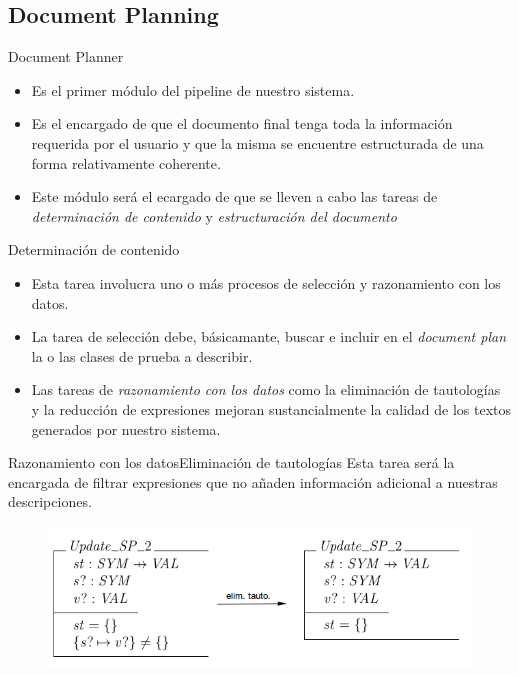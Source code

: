 \documentclass{beamer}
\begin{document}
\subsection{Document Planning}
                                
\begin{frame}{Document Planner}{}
  \begin{itemize}
    \item Es el primer módulo del pipeline de nuestro sistema.
    \item Es el encargado de que el documento final tenga toda la información requerida por el usuario y que la misma se encuentre estructurada de una forma relativamente coherente.
    \item Este módulo será el ecargado de que se lleven a cabo las tareas de \textit{determinación de contenido} y \textit{estructuración del documento}
  \end{itemize}
\end{frame}
                                
                                
\begin{frame}{Determinación de contenido}{}
  \begin{itemize}
    \item Esta tarea involucra uno o más procesos de selección y razonamiento con los datos.
    \item La tarea de selección debe, básicamante, buscar e incluir en el \textit{document plan} la o las clases de prueba a describir.
    \item Las tareas de \textit{razonamiento con los datos} como la eliminación de tautologías y la reducción de expresiones mejoran sustancialmente la calidad de los textos generados por nuestro sistema.
  \end{itemize}
\end{frame}
                                
\begin{frame}{Razonamiento con los datos}{Eliminación de tautologías}
  Esta tarea será la encargada de filtrar expresiones que no añaden información adicional a nuestras descripciones.
  \begin{figure}[H]
    \centering
    \includegraphics[scale=0.4]{img/ej_elim_tauto.png}
  \end{figure}
\end{frame}
                                
\end{document}

